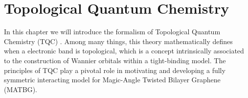 


\chapter{Topological Quantum Chemistry}

In this chapter we will introduce the formalism of Topological Quantum Chemistry (TQC) \cite{topological_quantum_chemistry2017, building_blocks2018, lectures_tms2017}. Among many things, this theory mathematically defines when a electronic band is topological, which is a concept intrinsically associated to the construction of Wannier orbitals within a tight-binding model. The principles of TQC play a pivotal role in motivating and developing a fully symmetric interacting model for Magic-Angle Twisted Bilayer Graphene (MATBG).

